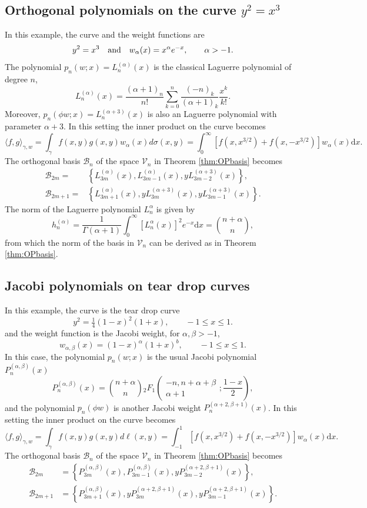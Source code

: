 \documentclass{amsart}
\theoremstyle{remark}
\def\la{{\langle}}
\def\ra{{\rangle}}
\def\d{\mathrm{d}}
\def\a{{\alpha}}
\def\b{{\beta}}
\def\g{{\gamma}}
\def\s{\sigma}
\def\la{{\langle}}
\def\ra{{\rangle}}
\def\CB{{\mathcal B}}
\def\CV{{\mathcal V}}
\begin{document}
\subsection{Orthogonal polynomials on the curve $y^2 = x^3$} 
In this example, the curve and the weight functions are 
$$
     y^2 = x^3 \quad \hbox{and} \quad w_\a(x) = x^\a e^{-x}, \qquad \a > -1.
$$
The polynomial $p_n(w;x) = L_n^{(\a)}(x)$ is the classical Laguerre polynomial of degree $n$,
$$
  L_n^{(\a)}(x) =\frac{(\a+1)_n}{n!} \sum_{k=0}^n \frac{(-n)_k}{(\a+1)_k } \frac{x^k}{k!}. 
$$
Moreover, $p_n(\phi w; x) = L_n^{(\a+3)}(x)$ is also an Laguerre polynomial with parameter $\a+3$.
In this setting the inner product on the curve becomes
$$
  \la f,g\ra_{\g,w} = \int_\g f(x,y) g(x,y) w_\a(x) d\s(x,y) = \int_0^\infty \left [ f(x,x^{3/2}) + f(x, - x^{3/2})\right] w_\a(x) \d x.
$$
The orthogonal basis $\CB_n$ of the space $\CV_n$ in Theorem \ref{thm:OPbasis} becomes 
\begin{align*}
  \CB_{2m}  = & \left\{L_{3m}^{(\a)}(x), L_{3m-1}^{(\a)}(x), y L_{3m-2}^{(\a+3)}(x)\right\}, \\
  \CB_{2m+1} = & \left \{L_{3m+1}^{(\a)}(x), y L_{3m}^{(\a+3)}(x), y L_{3m-1}^{(\a+3)}(x)\right\}.  
\end{align*}
The norm of the Laguerre polynomial $L_n^\a$ is given by
$$
  h_n^{(\a)} = \frac{1}{\Gamma(\a+1)} \int_0^\infty [L_n^{\a}(x)]^2 e^{-x} \d x = \binom{n+\a}{n}, 
$$
from which the norm of the basis in $\CV_n$ can be derived as in Theorem \ref{thm:OPbasis}. 

\subsection{Jacobi polynomials on tear drop curves}
In this example, the curve is the tear drop curve 
\begin{equation}
   y^2= \tfrac14  (1-x)^2 (1+x), \qquad -1 \le x \le 1. 
\end{equation}
and the weight function is the Jacobi weight, for $\a, \b > -1$,
\begin{equation}
     w_{\a,\b}(x) = (1-x)^\a (1+x)^b, \qquad -1 \le x \le 1. 
\end{equation}
In this case, the polynomial $p_n(w;x)$ is the usual Jacobi polynomial $P_n^{(\a,\b)}(x)$ 
$$
  P_n^{(\a,\b)}(x) = \binom{n+\a}{n} {}_2F_1 \left(\begin{matrix} -n, n+\a+\b \\ \a+1 \end{matrix}; \frac{1-x}{2} \right),
$$
and the polynomial $p_n(\phi w)$ is another Jacobi weight $P_n^{(\a+2,\b+1)}(x)$. 
In this setting the inner product on the curve becomes
$$
  \la f,g\ra_{\g,w} = \int_\g f(x,y) g(x,y) d\ell(x,y) = \int_{-1}^1 \left [ f(x,x^{3/2}) + f(x, - x^{3/2})\right] w_\a(x) \d x.
$$
The orthogonal basis $\CB_n$ of the space $\CV_n$ in Theorem \ref{thm:OPbasis} becomes 
\begin{align*}
  \CB_{2m} & = \left\{P_{3m}^{(\a,\b)}(x), P_{3m-1}^{(\a,\b)}(x), y P_{3m-2}^{(\a+2,\b+1)}(x)\right\}, \\
  \CB_{2m+1} & = \left \{P_{3m+1}^{(\a,\b)}(x), y P_{3m}^{(\a+2,\b+1)}(x), y P_{3m-1}^{(\a+2,\b+1)}(x)\right\}.  
\end{align*}
\end{document}
